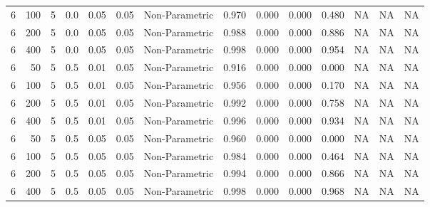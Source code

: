 \begin{table}
{{\begin{tabular}{rrrrrrllllllll}
\hspace{1em}6 & 100 & 5 & 0.0 & 0.05 & 0.05 & Non-Parametric & 0.970 & 0.000 & 0.000 & 0.480 & NA & NA & NA\\
\hspace{1em}6 & 200 & 5 & 0.0 & 0.05 & 0.05 & Non-Parametric & 0.988 & 0.000 & 0.000 & 0.886 & NA & NA & NA\\
\hspace{1em}6 & 400 & 5 & 0.0 & 0.05 & 0.05 & Non-Parametric & 0.998 & 0.000 & 0.000 & 0.954 & NA & NA & NA\\
\hspace{1em}6 & 50 & 5 & 0.5 & 0.01 & 0.05 & Non-Parametric & 0.916 & 0.000 & 0.000 & 0.000 & NA & NA & NA\\
\hspace{1em}6 & 100 & 5 & 0.5 & 0.01 & 0.05 & Non-Parametric & 0.956 & 0.000 & 0.000 & 0.170 & NA & NA & NA\\
\hspace{1em}6 & 200 & 5 & 0.5 & 0.01 & 0.05 & Non-Parametric & 0.992 & 0.000 & 0.000 & 0.758 & NA & NA & NA\\
\hspace{1em}6 & 400 & 5 & 0.5 & 0.01 & 0.05 & Non-Parametric & 0.996 & 0.000 & 0.000 & 0.934 & NA & NA & NA\\
\hspace{1em}6 & 50 & 5 & 0.5 & 0.05 & 0.05 & Non-Parametric & 0.960 & 0.000 & 0.000 & 0.000 & NA & NA & NA\\
\hspace{1em}6 & 100 & 5 & 0.5 & 0.05 & 0.05 & Non-Parametric & 0.984 & 0.000 & 0.000 & 0.464 & NA & NA & NA\\
\hspace{1em}6 & 200 & 5 & 0.5 & 0.05 & 0.05 & Non-Parametric & 0.994 & 0.000 & 0.000 & 0.866 & NA & NA & NA\\
\hspace{1em}6 & 400 & 5 & 0.5 & 0.05 & 0.05 & Non-Parametric & 0.998 & 0.000 & 0.000 & 0.968 & NA & NA & NA\\
\bottomrule
\end{tabular}
}}
 \end{table}
